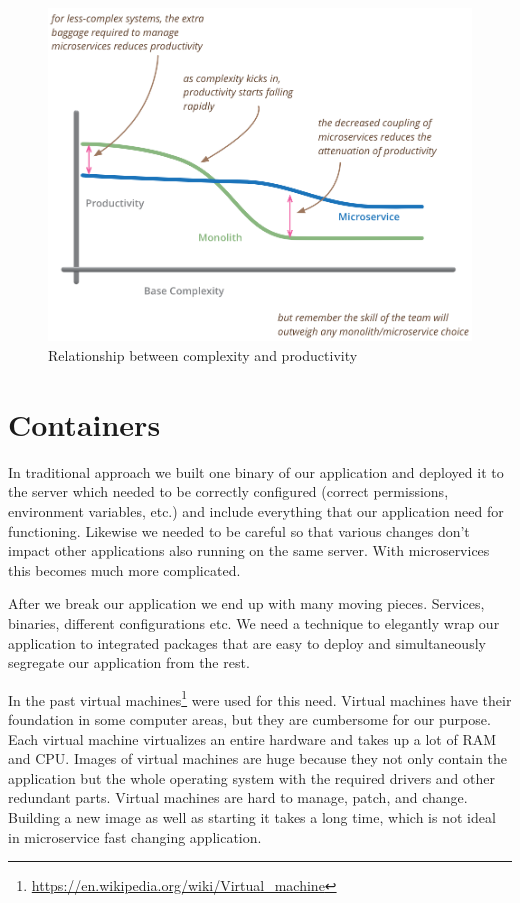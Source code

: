 \documentclass[12pt,oneside]{fithesis2}
\begin{document}
\begin{figure}[ht!]
	\label{productivity}
	\centering
	\includegraphics[width=\textwidth]{images/complexity_productivity.png}
	\caption{Relationship between complexity and productivity\footnotemark}
\end{figure}


\section{Containers}

In traditional approach we built one binary of our application and deployed it to the server which needed to be correctly configured (correct permissions, environment variables, etc.) and include everything that our application need for functioning. Likewise we needed to be careful so that various changes don't impact other applications also running on the same server. With microservices this becomes much more complicated.

After we break our application we end up with many moving pieces. Services, binaries, different configurations etc. We need a technique to elegantly wrap our application to integrated packages that are easy to deploy and simultaneously segregate our application from the rest.

In the past virtual machines\footnote{\url{https://en.wikipedia.org/wiki/Virtual_machine}} were used for this need. Virtual machines have their foundation in some computer areas, but they are cumbersome for our purpose. Each virtual machine virtualizes an entire hardware and takes up a lot of RAM and CPU. Images of virtual machines are huge because they not only contain the application but the whole operating system with the required drivers and other redundant parts. Virtual machines are hard to manage, patch, and change. Building a new image as well as starting it takes a long time, which is not ideal in microservice fast changing application.
\end{document}
